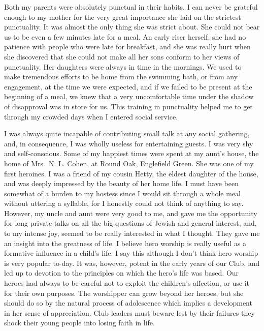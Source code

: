 Both my parents were absolutely punctual in their
habits. I can never be grateful enough to my mother for
the very great importance she laid on the strictest punctuality.
It was almost the only thing she was strict about.
She could not bear us to be even a few minutes late for a
meal. An early riser herself, she had no patience with
people who were late for breakfast, and she was really
hurt when she discovered that she could not make all her
sons conform to her views of punctuality. Her daughters
were always in time in the mornings. We used to make
tremendous efforts to be home from the swimming bath,
or from any engagement, at the time we were expected,
and if we failed to be present at the beginning of a meal,
we knew that a very uncomfortable time under the
shadow of disapproval was in store for us. This training
in punctuality helped me to get through my crowded days
when I entered social service.

I was always quite incapable of contributing small talk
at any social gathering, and, in consequence, I was wholly
useless for entertaining guests. I was very shy and self-conscious.
Some of my happiest times were spent at my
aunt’s house, the home of Mrs.\ N. L. Cohen, at Round
Oak, Englefield Green. She was one of my first heroines.
I was a friend of my cousin Hetty, the eldest daughter of
the house, and was deeply impressed by the beauty of her
home life. I must have been somewhat of a burden to my
hostess since I would sit through a whole meal without
uttering a syllable, for I honestly could not think of anything
to say. However, my uncle and aunt were very good
to me, and gave me the opportunity for long private talks
on all the big questions of Jewish and general interest,
and, to my intense joy, seemed to be really interested in
what I thought. They gave me an insight into the greatness
of life. I believe hero worship is really useful as a
formative influence in a child’s life. I say this although I
don’t think hero worship is very popular to-day. It was,
however, potent in the early years of our Club, and led up
to devotion to the principles on which the hero’s life was
based. Our heroes had always to be careful not to exploit
the children’s affection, or use it for their own purposes.
The worshipper can grow beyond her heroes, but she
should do so by the natural process of adolescence which
implies a development in her sense of appreciation. Club
leaders must beware lest by their failures they shock their
young people into losing faith in life.


